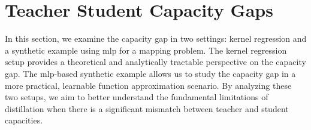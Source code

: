 
\section{Teacher Student Capacity Gaps}
\label{sec:teacher-student-capacity-gaps}

In this section, we examine the capacity gap in two settings: kernel regression and a synthetic example using \gls{mlp} for a mapping problem. The kernel regression setup provides a theoretical and analytically tractable perspective on the capacity gap. The \gls{mlp}-based synthetic example allows us to study the capacity gap in a more practical, learnable function approximation scenario. By analyzing these two setups, we aim to better understand the fundamental limitations of distillation when there is a significant mismatch between teacher and student capacities.


\FloatBarrier

